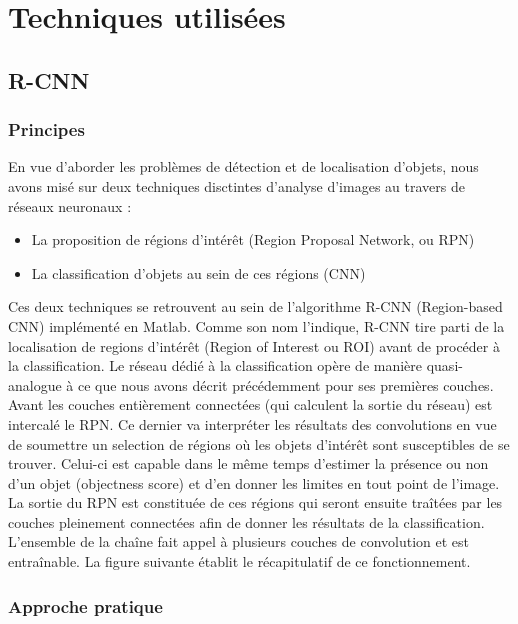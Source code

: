 \chapter{Techniques utilisées}

   \section{R-CNN}

    \subsection{Principes}
      
      En vue d'aborder les problèmes de détection et de localisation d'objets, nous avons misé sur deux techniques disctintes d'analyse d'images au travers de réseaux neuronaux : 
      \begin{itemize}
       \item La proposition de régions d'intérêt (Region Proposal Network, ou RPN)
       \item La classification d'objets au sein de ces régions (CNN)
      \end{itemize}
      
      Ces deux techniques se retrouvent au sein de l'algorithme R-CNN\cite{Bib_RCNN} (Region-based CNN) implémenté en Matlab.
      Comme son nom l'indique, R-CNN tire parti de la localisation de regions d'intérêt (Region of Interest ou ROI) avant de procéder à la classification. 
      Le réseau dédié à la classification opère de manière quasi-analogue à ce que nous avons décrit précédemment pour ses premières couches. Avant les couches entièrement connectées (qui calculent
      la sortie du réseau) est intercalé le RPN. 
      Ce dernier va interpréter les résultats des convolutions en vue de soumettre un selection de régions où les objets d'intérêt sont susceptibles de se trouver. 
      Celui-ci est capable dans le même temps d'estimer la présence ou non d'un objet (objectness score) et d'en donner les limites en tout point de l'image. 
      La sortie du RPN est constituée de ces régions qui seront ensuite traîtées par les couches pleinement connectées afin de donner les résultats de la classification. 
      L'ensemble de la chaîne fait appel à plusieurs couches de convolution et est entraînable. 
      La figure suivante établit le récapitulatif de ce fonctionnement.  
     
      
    \subsection{Approche pratique}
    
